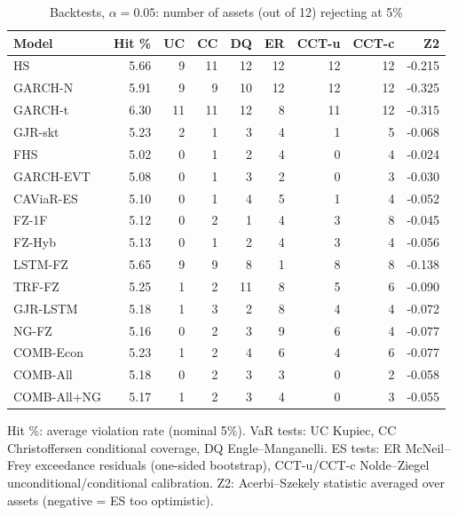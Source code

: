 \begin{table}[htbp]
\centering
\footnotesize
\caption{Backtests, $\alpha=0.05$: number of assets (out of 12) rejecting at 5\%}
\label{tab:bt_a050}
\begin{tabular}{lrrrrrrrr}
\toprule
Model & Hit \% & UC & CC & DQ & ER & CCT-u & CCT-c & Z2 \\
\midrule
HS & 5.66 & 9 & 11 & 12 & 12 & 12 & 12 & -0.215 \\
GARCH-N & 5.91 & 9 & 9 & 10 & 12 & 12 & 12 & -0.325 \\
GARCH-t & 6.30 & 11 & 11 & 12 & 8 & 11 & 12 & -0.315 \\
GJR-skt & 5.23 & 2 & 1 & 3 & 4 & 1 & 5 & -0.068 \\
FHS & 5.02 & 0 & 1 & 2 & 4 & 0 & 4 & -0.024 \\
GARCH-EVT & 5.08 & 0 & 1 & 3 & 2 & 0 & 3 & -0.030 \\
CAViaR-ES & 5.10 & 0 & 1 & 4 & 5 & 1 & 4 & -0.052 \\
FZ-1F & 5.12 & 0 & 2 & 1 & 4 & 3 & 8 & -0.045 \\
FZ-Hyb & 5.13 & 0 & 1 & 2 & 4 & 3 & 4 & -0.056 \\
LSTM-FZ & 5.65 & 9 & 9 & 8 & 1 & 8 & 8 & -0.138 \\
TRF-FZ & 5.25 & 1 & 2 & 11 & 8 & 5 & 6 & -0.090 \\
GJR-LSTM & 5.18 & 1 & 3 & 2 & 8 & 4 & 4 & -0.072 \\
NG-FZ & 5.16 & 0 & 2 & 3 & 9 & 6 & 4 & -0.077 \\
COMB-Econ & 5.23 & 1 & 2 & 4 & 6 & 4 & 6 & -0.077 \\
COMB-All & 5.18 & 0 & 2 & 3 & 3 & 0 & 2 & -0.058 \\
COMB-All+NG & 5.17 & 1 & 2 & 3 & 4 & 0 & 3 & -0.055 \\
\bottomrule
\end{tabular}
\par\smallskip\parbox{\linewidth}{\scriptsize Hit \%: average violation rate (nominal 5\%). VaR tests: UC Kupiec, CC Christoffersen conditional coverage, DQ Engle--Manganelli. ES tests: ER McNeil--Frey exceedance residuals (one-sided bootstrap), CCT-u/CCT-c Nolde--Ziegel unconditional/conditional calibration. Z2: Acerbi--Szekely statistic averaged over assets (negative = ES too optimistic).}
\end{table}